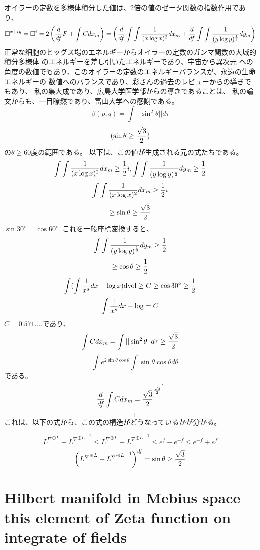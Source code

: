 \documentclass{jsarticle}
\begin{document}
  オイラーの定数を多様体積分した値は、2倍の値のゼータ関数の指数作用であり、
  $$ \square^{x + iy} = \square^{i} = 2\left({d \over df}F + \int C dx_m\right) = \left({d \over df}\int \int
  {1 \over {(x \log x)^2}}dx_m + {d \over df}\int\int{1 \over {(y \log y)^{1 \over 2}}}dy_m\right) $$
  正常な細胞のヒッグス場のエネルギーからオイラーの定数のガンマ関数の大域的積分多様体
   のエネルギーを差し引いたエネルギーであり、宇宙から異次元
  への角度の数値でもあり、このオイラーの定数のエネルギーバランスが、永遠の生命エネルギーの
  数値へのバランスであり、彩さんの過去のレビューからの導きでもあり、
  私の集大成であり、広島大学医学部からの導きであることは、
  私の論文からも、一目瞭然であり、富山大学への感謝である。
   $$\beta(p,q) = \int||\sin^{2} \theta||d\tau $$
   $$ (\sin \theta \ge {\sqrt{3} \over 2}) $$
   の$\theta \ge 60$度の範囲である。
   以下は、この値が生成される元の式たちである。
   $$ \int \int{1 \over (x \log x)^2}dx_m \ge {1 \over 2}i, \int \int{1 \over (y \log y)^{1 \over 2}}dy_m
   \ge {1 \over 2} $$
   $$ \int \int{1 \over (x \log x)^2}dx_m \ge {1 \over 2}i $$
   $$ \ge {\sin \theta } \ge {\sqrt{3} \over 2} $$
    $\sin 30^{\circ} = \cos 60^{\circ}$. これを一般座標変換すると、 
   $$ \int \int{1 \over (y \log y)^{1 \over 2}}dy_m
   \ge {1 \over 2} $$
   $$ \ge {\cos \theta} \ge {1 \over 2} $$
   $$ \int(\int {1 \over x^s}dx - \log x)\mathrm{dvol} \ge C \ge \cos 30^{\circ} \ge {1 \over 2} $$
   $$ \int {1 \over x^s}dx - \log = C $$
   $C = 0.571....$であり、
   $$ \int C dx_m = \int||\sin^{2} \theta||d\tau \ge {\sqrt{3} \over 2} $$
   $$ = \int e^{2\sin \theta \cos \theta}\int \sin \theta \cos \theta d\theta $$
   である。
   $$ {d \over df} \int C dx_m = {{\sqrt{3} \over 2}^{{\sqrt{3} \over 2}}}^{'} $$
   $$ = 1 $$
   これは、以下の式から、この式の構造がどうなっているかが分かる。

   $$ {L^{\nabla}}^{\oplus L} - {{L^{\nabla}}^{\oplus L}}^{-1} 
  \le {L^{\nabla}}^{\oplus L} + {{L^{\nabla}}^{\oplus L}}^{-1} \le
  e^{f} - e^{-f} \le e^{-f} + e^{f} $$
  $$ \left({L^{\nabla}}^{\oplus L} + {{L^{\nabla}}^{\oplus L}}^{-1}\right)^{df}
  = \sin \theta \ge {\sqrt{3} \over 2} $$

\section{Hilbert manifold in Mebius space \\
        this element of Zeta function on integrate of fields}
\end{document}
